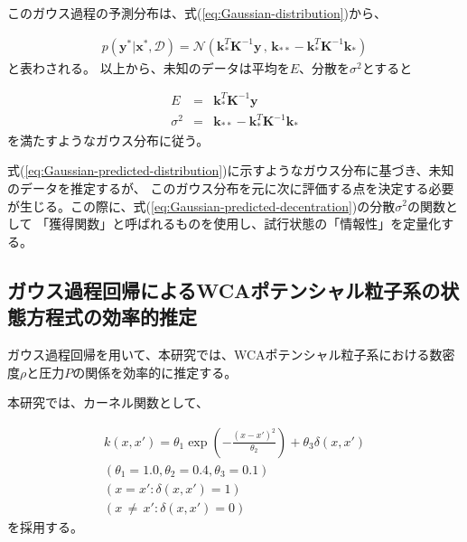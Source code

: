 \documentclass[titlepage]{jsreport}
\begin{document}
{{{このガウス過程の予測分布は、式(\ref{eq:Gaussian-distribution})から、

\large
\begin{eqnarray}
p(\bm{y}^*|\bm{x}^*,\mathcal{D})
={\mathcal{N}}(\bm{k}_*^T\bm{K}^{-1}\bm{y}\,,\,\bm{k}_{**}-\bm{k}_*^T\bm{K}^{-1}\bm{k}_*)  \label{eq:Gaussian-predicted-distribution}
\end{eqnarray}
\normalsize
と表わされる。
以上から、未知のデータは平均を$E$、分散を$\sigma^2$とすると

\large
\begin{eqnarray}
    E&=&\bm{k}_*^T\bm{K}^{-1}\bm{y}\\ \label{eq:Gaussian-predicted-average}
    \sigma^2&=&\bm{k}_{**}-\bm{k}_*^T\bm{K}^{-1}\bm{k}_* \label{eq:Gaussian-predicted-decentration}
\end{eqnarray}
\normalsize
を満たすようなガウス分布に従う\cite{Gauss-machine-learning}。

式(\ref{eq:Gaussian-predicted-distribution})に示すようなガウス分布に基づき、未知のデータを推定するが、
このガウス分布を元に次に評価する点を決定する必要が生じる。この際に、式(\ref{eq:Gaussian-predicted-decentration})の分散$\sigma^2$の関数として
「獲得関数」と呼ばれるものを使用し、試行状態の「情報性」を定量化する\cite{acquisition-function}。


\subsection{ガウス過程回帰によるWCAポテンシャル粒子系の状態方程式の効率的推定}\label{method-subsec:Gaussian-estimation}
ガウス過程回帰を用いて、本研究では、WCAポテンシャル粒子系における数密度$\rho$と圧力$P$の関係を効率的に推定する。

本研究では、カーネル関数として、

\large
\begin{eqnarray}
    k(x,x')=\theta_1\exp\left(-\frac{(x-x')^2}{\theta_2}\right)+\theta_3\delta(x,x')\\ \label{eq:Gauss-kernel}
    (\theta_1=1.0,\theta_2=0.4,\theta_3=0.1) \nonumber \\ 
    (x=x':\delta(x,x')=1) \nonumber \\
    (x\,{\neq}\,x':\delta(x,x')=0) \nonumber
\end{eqnarray}
\normalsize
を採用する\cite{Gauss-machine-learning}。

}}}
\end{document}
